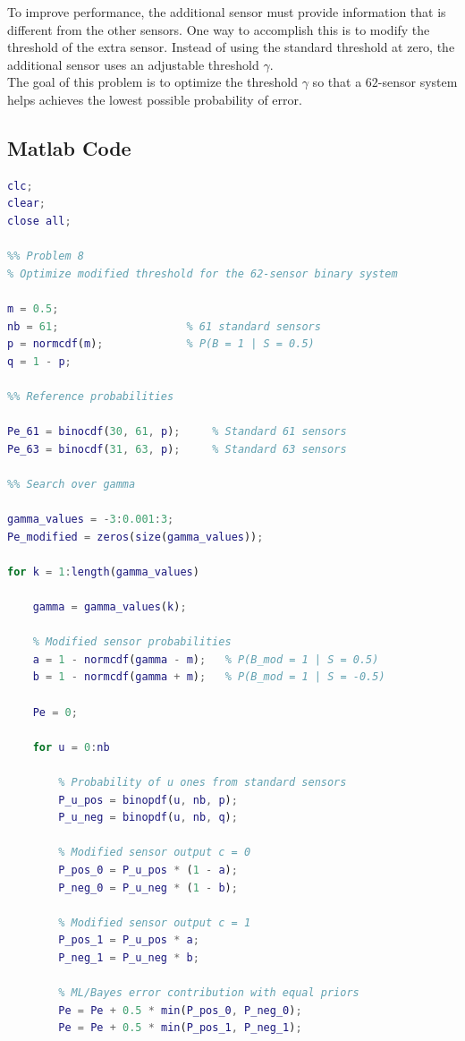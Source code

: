 \documentclass[12pt,a4paper]{article}
\begin{document}
To improve performance, the additional sensor must provide information that is different from the other sensors. One way to accomplish this is to modify the threshold of the extra sensor. Instead of using the standard threshold at zero, the additional sensor uses an adjustable threshold \(\gamma\).\\

The goal of this problem is to optimize the threshold \(\gamma\) so that a \(62\)-sensor system helps achieves the lowest possible probability of error.

\subsection{Matlab Code}
\begin{lstlisting}[language=Matlab, caption={Matlab Code: Problem 8}]
clc;
clear;
close all;

%% Problem 8
% Optimize modified threshold for the 62-sensor binary system

m = 0.5;
nb = 61;                    % 61 standard sensors
p = normcdf(m);             % P(B = 1 | S = 0.5)
q = 1 - p;

%% Reference probabilities

Pe_61 = binocdf(30, 61, p);     % Standard 61 sensors
Pe_63 = binocdf(31, 63, p);     % Standard 63 sensors

%% Search over gamma

gamma_values = -3:0.001:3;
Pe_modified = zeros(size(gamma_values));

for k = 1:length(gamma_values)

    gamma = gamma_values(k);

    % Modified sensor probabilities
    a = 1 - normcdf(gamma - m);   % P(B_mod = 1 | S = 0.5)
    b = 1 - normcdf(gamma + m);   % P(B_mod = 1 | S = -0.5)

    Pe = 0;

    for u = 0:nb

        % Probability of u ones from standard sensors
        P_u_pos = binopdf(u, nb, p);
        P_u_neg = binopdf(u, nb, q);

        % Modified sensor output c = 0
        P_pos_0 = P_u_pos * (1 - a);
        P_neg_0 = P_u_neg * (1 - b);

        % Modified sensor output c = 1
        P_pos_1 = P_u_pos * a;
        P_neg_1 = P_u_neg * b;

        % ML/Bayes error contribution with equal priors
        Pe = Pe + 0.5 * min(P_pos_0, P_neg_0);
        Pe = Pe + 0.5 * min(P_pos_1, P_neg_1);


\end{lstlisting}
\end{document}
